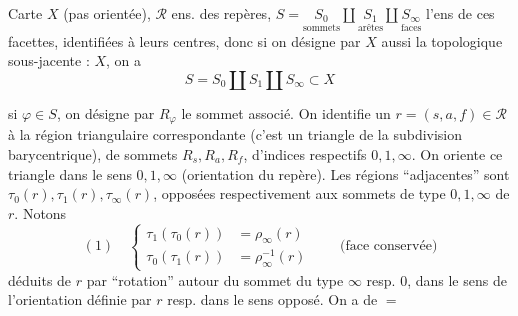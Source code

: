


Carte $X$ (pas orientée), $\mathcal R$ ens. des repères,
$S=\underset{\text{sommets}}{S_0}\amalg\underset{\text{arêtes}}{S_1}\amalg\underset{\text{faces}}{S_\infty}$
l'ens de ces facettes, identifiées à  leurs centres, donc si on désigne par $X$ aussi la  topologique sous-jacente : $X$, on a
\[
 S=S_0\amalg S_1\amalg S_\infty\subset X
\]

si $\varphi\in S$, on désigne par $R_\varphi$ le sommet associé. On identifie un $r=(s,a,f)\in\mathcal R$ à la région triangulaire correspondante (c'est un triangle de la subdivision barycentrique), de sommets $R_s,R_a,R_f$, d'indices respectifs $0,1,\infty$. On oriente ce triangle dans le sens $0,1,\infty$ (orientation du repère). Les régions ``adjacentes'' sont $\tau_0(r),\tau_1(r),\tau_\infty(r)$, opposées respectivement aux sommets de type $0,1,\infty$ de $r$. Notons
\[
 (1)\quad
 \left\{\begin{aligned}
 \tau_1(\tau_0(r))&=\rho_\infty(r)\\
 \tau_0(\tau_1(r))&=\rho_\infty^{-1}(r)
 \end{aligned}\right.
 \qquad\text{(face conservée)}
\]
déduits de $r$ par ``rotation''  autour du sommet du type $\infty$ resp. $0$, dans le sens  de l'orientation définie par $r$ resp. dans le sens opposé. On a de $=$

